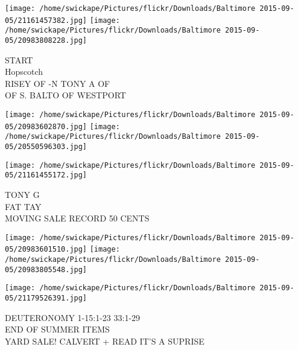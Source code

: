 \documentclass[10pt,letterpaper]{article}
\begin{document}
\texttt{[image: /home/swickape/Pictures/flickr/Downloads/Baltimore 2015-09-05/21161457382.jpg]}
\texttt{[image: /home/swickape/Pictures/flickr/Downloads/Baltimore 2015-09-05/20983808228.jpg]}

START\\
Hopscotch\\
RISEY OF {-}N TONY A OF\\
OF S. BALTO OF WESTPORT
\pagebreak

\texttt{[image: /home/swickape/Pictures/flickr/Downloads/Baltimore 2015-09-05/20983602870.jpg]}
\texttt{[image: /home/swickape/Pictures/flickr/Downloads/Baltimore 2015-09-05/20550596303.jpg]}

\vspace{0.25in}
\texttt{[image: /home/swickape/Pictures/flickr/Downloads/Baltimore 2015-09-05/21161455172.jpg]}

TONY G\\
FAT TAY\\
MOVING SALE RECORD 50 CENTS
\pagebreak

\texttt{[image: /home/swickape/Pictures/flickr/Downloads/Baltimore 2015-09-05/20983601510.jpg]}
\texttt{[image: /home/swickape/Pictures/flickr/Downloads/Baltimore 2015-09-05/20983805548.jpg]}

\texttt{[image: /home/swickape/Pictures/flickr/Downloads/Baltimore 2015-09-05/21179526391.jpg]}

DEUTERONOMY 1{-}15:1{-}23 33:1{-}29\\
END OF SUMMER ITEMS\\
YARD SALE! CALVERT + READ IT'S A SUPRISE
\pagebreak
\end{document}
